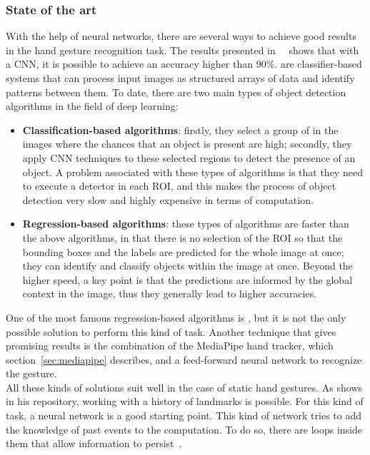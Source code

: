 \documentclass[../thesis.tex]{subfiles}
\begin{document}
\subsubsection{State of the art}
With the help of neural networks, there are several ways to achieve good results in the hand gesture recognition task. The results presented in~\citeauthor{paper:survey_on_vision_based_hand_gesture_recognition}~\cite{paper:survey_on_vision_based_hand_gesture_recognition} shows that with a \acrfull{CNN}, it is possible to achieve an accuracy higher than  $90\%$.  are classifier-based systems that can process input images as structured arrays of data and identify patterns between them. To date, there are two main types of object detection algorithms in the field of deep learning: 
\begin{itemize}
    \item \textbf{Classification-based algorithms}: firstly, they select a group of  in the images where the chances that an object is present are high; secondly, they apply \acrshort{CNN} techniques to these selected regions to detect the presence of an object. A problem associated with these types of algorithms is that they need to execute a detector in each \acrshort{ROI}, and this makes the process of object detection very slow and highly expensive in terms of computation.
    \item \textbf{Regression-based algorithms}: these types of algorithms are faster than the above algorithms, in that there is no selection of the \acrshort{ROI} so that the bounding boxes and the labels are predicted for the whole image at once; they can identify and classify objects within the image at once. Beyond the higher speed, a key point is that the predictions are informed by the global context in the image, thus they generally lead to higher accuracies.
\end{itemize}
One of the most famous regression-based algorithms is , but it is not the only possible solution to perform this kind of task. Another technique that gives promising results is the combination of the MediaPipe hand tracker, which section~\ref{sec:mediapipe} describes, and a feed-forward neural network to recognize the gesture.\\ All these kinds of solutions suit well in the case of static hand gestures. As  \citeauthor{site:hand_gesture_base_repo} shows in his repository\cite{site:hand_gesture_base_repo}, working with a history of landmarks is possible. For this kind of task, a  neural network is a good starting point. This kind of network tries to add the knowledge of past events to the computation. To do so, there are loops inside them that allow information to persist~\cite{site:understanding_lstm_networks}.
\end{document}
